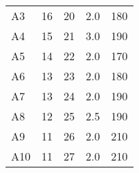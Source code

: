 \begin{table}[hbt!]
\begin{tabular}{@{} P{0.1\textwidth} *4{P{0.225\textwidth}} @{}}
		A3   & 16                                                                                      & 20                                                                                    & 2.0                                                                         & 180                                                                   \\ %
		A4   & 15                                                                                      & 21                                                                                    & 3.0                                                                         & 190                                                                   \\ %
		A5   & 14                                                                                      & 22                                                                                    & 2.0                                                                         & 170                                                                   \\ %
		A6   & 13                                                                                      & 23                                                                                    & 2.0                                                                         & 180                                                                   \\ %
		A7   & 13                                                                                      & 24                                                                                    & 2.0                                                                         & 190                                                                   \\ %
		A8   & 12                                                                                      & 25                                                                                    & 2.5                                                                         & 190                                                                   \\ %
		A9   & 11                                                                                      & 26                                                                                    & 2.0                                                                         & 210                                                                   \\ %
		A10  & 11                                                                                      & 27                                                                                    & 2.0                                                                         & 210                                                                   \\ \bottomrule
	\end{tabular}
	\label{tab:hslm_a_parameters}
\end{table}


